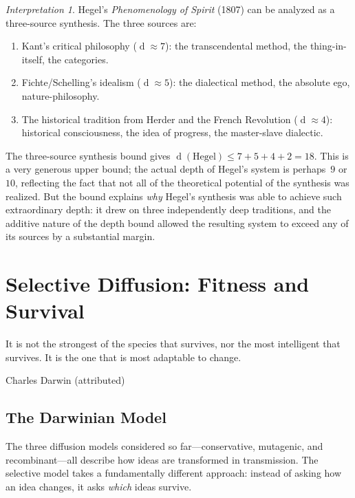 \documentclass[11pt,openany]{book}
\theoremstyle{definition}
\theoremstyle{plain}
\theoremstyle{remark}
\newtheorem{interpretation}[axiom]{Interpretation}
\newcommand{\depth}{\operatorname{d}}       %
\begin{document}
\begin{interpretation}
Hegel's \emph{Phenomenology of Spirit} (1807) can be analyzed as a three-source synthesis. The three sources are:
\begin{enumerate}
\item Kant's critical philosophy ($\depth \approx 7$): the transcendental method, the thing-in-itself, the categories.
\item Fichte/Schelling's idealism ($\depth \approx 5$): the dialectical method, the absolute ego, nature-philosophy.
\item The historical tradition from Herder and the French Revolution ($\depth \approx 4$): historical consciousness, the idea of progress, the master-slave dialectic.
\end{enumerate}

The three-source synthesis bound gives $\depth(\text{Hegel}) \leq 7 + 5 + 4 + 2 = 18$. This is a very generous upper bound; the actual depth of Hegel's system is perhaps~$9$ or~$10$, reflecting the fact that not all of the theoretical potential of the synthesis was realized. But the bound explains \emph{why} Hegel's synthesis was able to achieve such extraordinary depth: it drew on three independently deep traditions, and the additive nature of the depth bound allowed the resulting system to exceed any of its sources by a substantial margin.
\end{interpretation}

\chapter{Selective Diffusion: Fitness and Survival}
\label{ch:selective}

\epigraph{It is not the strongest of the species that survives, nor the most intelligent that survives. It is the one that is most adaptable to change.}{Charles Darwin (attributed)}

\section{The Darwinian Model}

The three diffusion models considered so far---conservative, mutagenic, and recombinant---all describe how ideas are transformed in transmission. The selective model takes a fundamentally different approach: instead of asking how an idea changes, it asks \emph{which} ideas survive.
\end{document}

